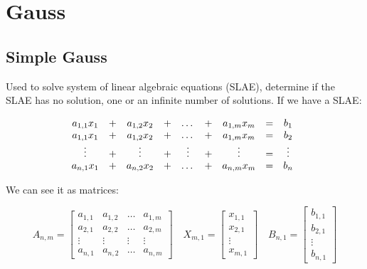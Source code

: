     \section{Gauss}

    \subsection{Simple Gauss}

    Used to solve system of linear algebraic equations (SLAE), determine if the SLAE has no solution, one or an infinite number of solutions. If we have a SLAE:
    
    \[
        \begin{matrix}
            a_{1,1}x_1 &+& a_{1,2}x_2 &+& \dots &+& a_{1,m}x_m &=& b_1 \\
            a_{1,1}x_1 &+& a_{1,2}x_2 &+& \dots &+& a_{1,m}x_m &=& b_2 \\
            \vdots     &+& \vdots     &+& \vdots&+& \vdots     &=& \vdots \\
            a_{n,1}x_1 &+& a_{n,2}x_2 &+& \dots &+& a_{n,m}x_m &=& b_n
        \end{matrix}
        \\  
    \]
    
    We can see it as matrices:
    
    \[
        A_{n,m} = \begin{bmatrix} 
            a_{1,1} & a_{1,2} & \dots & a_{1,m} \\
            a_{2,1} & a_{2,2} & \dots & a_{2,m} \\
            \vdots  & \vdots  &  \vdots& \vdots \\
            a_{n,1} & a_{n,2} & \dots & a_{n,m} 
        \end{bmatrix}
        \quad
        X_{m,1} = \begin{bmatrix} 
            x_{1,1} \\
            x_{2,1} \\
            \vdots  \\
            x_{m,1}  
        \end{bmatrix} 
        \quad
        B_{n,1} = \begin{bmatrix} 
            b_{1,1} \\
            b_{2,1} \\
            \vdots  \\
            b_{n,1}  
        \end{bmatrix} 
    \]

